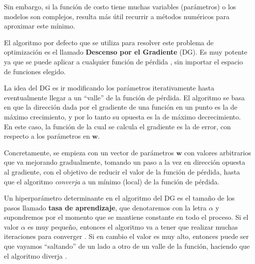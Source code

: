 \documentclass[../../main.tex]{subfiles}
\begin{document}
Sin embargo, si la función de costo tiene muchas variables (parámetros) o los modelos son
complejos, resulta más útil recurrir a métodos numéricos para aproximar este mínimo.

El algoritmo por defecto que se utiliza para resolver este problema de optimización es el
llamado \textbf{Descenso por el Gradiente} (DG). Es muy potente ya que se puede aplicar a
cualquier función de pérdida \cite{ai-a-modern-approach}, sin importar el espacio de
funciones elegido.


La idea del DG es ir modificando los parámetros iterativamente hasta eventualmente llegar
a un ``valle'' de la función de pérdida. El algoritmo se basa en que la dirección dada por
el gradiente\footnotemark{} de una función en un punto es la de máximo crecimiento, y por
lo tanto su opuesta es la de máximo decrecimiento. En este caso, la función de la cual se
calcula el gradiente es la de error, con respecto a los parámetros en \(\bm{w}\).

Concretamente, se empieza con un vector de parámetros \(\bm{w}\) con valores arbitrarios que
va mejorando gradualmente, tomando un paso a la vez en dirección opuesta al gradiente, con
el objetivo de reducir el valor de la función de pérdida, hasta que el algoritmo
\textit{converja} a un mínimo (local) de la función de pérdida.

Un hiperparámetro\footnotemark{} determinante en el algoritmo del DG es el tamaño de los
pasos llamado \textbf{tasa de aprendizaje}, que denotaremos con la letra \(\alpha\) y
supondremos por el momento que se mantiene constante en todo el proceso. Si el valor
\(\alpha\) es muy pequeño, entonces el algoritmo va a tener que realizar muchas
iteraciones para converger \cite{hands-on-ML-sklearn-tf}. Si en cambio el valor es muy
alto, entonces puede ser que vayamos ``saltando'' de un lado a otro de un valle de la
función, haciendo que el algoritmo diverja \cite{hands-on-ML-sklearn-tf}.
\end{document}
